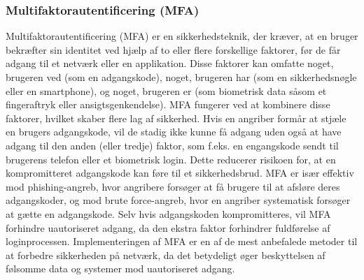 \subsubsection{Multifaktorautentificering (MFA)}
Multifaktorautentificering (MFA) er en sikkerhedsteknik, der kræver, at en bruger bekræfter sin identitet ved hjælp af to eller flere forskellige faktorer, før de får adgang til et netværk eller en applikation. Disse faktorer kan omfatte noget, brugeren ved (som en adgangskode), noget, brugeren har (som en sikkerhedsnøgle eller en smartphone), og noget, brugeren er (som biometrisk data såsom et fingeraftryk eller ansigtsgenkendelse).
\newline\newline\noindent
MFA fungerer ved at kombinere disse faktorer, hvilket skaber flere lag af sikkerhed. Hvis en angriber formår at stjæle en brugers adgangskode, vil de stadig ikke kunne få adgang uden også at have adgang til den anden (eller tredje) faktor, som f.eks. en engangskode sendt til brugerens telefon eller et biometrisk login. Dette reducerer risikoen for, at en kompromitteret adgangskode kan føre til et sikkerhedsbrud.
\newline\newline\noindent
MFA er især effektiv mod phishing-angreb, hvor angribere forsøger at få brugere til at afsløre deres adgangskoder, og mod brute force-angreb, hvor en angriber systematisk forsøger at gætte en adgangskode. Selv hvis adgangskoden kompromitteres, vil MFA forhindre uautoriseret adgang, da den ekstra faktor forhindrer fuldførelse af loginprocessen.
\newline\newline\noindent
Implementeringen af MFA er en af de mest anbefalede metoder til at forbedre sikkerheden på netværk, da det betydeligt øger beskyttelsen af følsomme data og systemer mod uautoriseret adgang.


